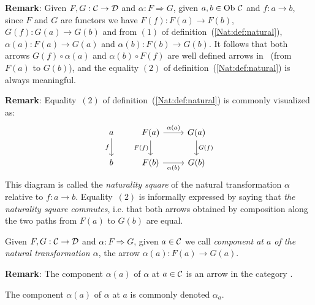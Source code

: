 \noindent
{\bf Remark}: Given $F,G:\mbox{$\cal C$}\to\mbox{$\cal D$}$ and $\alpha:F\Rightarrow G$, given
$a,b\in\mbox{\rm Ob}\ \mbox{$\cal C$}$ and $f:a \to b$, since $F$ and $G$ are functors we have 
$F(f):F(a) \to F(b)$, $G(f):G(a)\to G(b)$ and from $(1)$ of 
definition~(\ref{Nat:def:natural}), $\alpha(a):F(a)\to G(a)$ and 
$\alpha(b):F(b)\to G(b)$. It follows that both arrows $G(f)\circ\alpha(a)$ 
and $\alpha(b)\circ F(f)$ are well defined arrows in \Dat\ (from $F(a)$ to 
$G(b)$), and the equality $(2)$ of definition~(\ref{Nat:def:natural}) is 
always meaningful.

\noindent
{\bf Remark}: Equality~$(2)$ of definition~(\ref{Nat:def:natural}) is commonly
visualized as: 
    \[
        \begin{tikzcd}
            a\arrow[d,swap, "f"]
            &F(a)\arrow[r, "\alpha(a)"]\arrow[d, swap,"F(f)"]
            &G(a)\arrow[d, "G(f)"]
            \\
            b
            &F(b)\arrow[r, swap, "\alpha(b)"]
            &G(b)
        \end{tikzcd}
    \]
This diagram is called the {\em naturality square} of the
natural transformation $\alpha$ relative to $f:a \to b$. Equality~$(2)$
is informally expressed by saying that {\em the naturality square commutes},
i.e. that both arrows obtained by composition along the two paths from $F(a)$ 
to $G(b)$ are equal. 

\begin{defin}\label{Nat:def:natural:component}
    Given $F,G:\mbox{$\cal C$}\to\mbox{$\cal D$}$ and $\alpha:F\Rightarrow G$, given $a\in\mbox{$\cal C$}$
    we call {\em component at $a$ of the natural transformation $\alpha$},
    the arrow $\alpha(a):F(a)\to G(a)$.
\end{defin}

\noindent
{\bf Remark}: The component $\alpha(a)$ of $\alpha$ at $a\in\mbox{$\cal C$}$ is an arrow 
in the category \Dat.

\begin{notation}\label{Nat:notation:natural:component}
    The component $\alpha(a)$ of $\alpha$ at $a$ is commonly denoted $\alpha_{a}$.
\end{notation}


